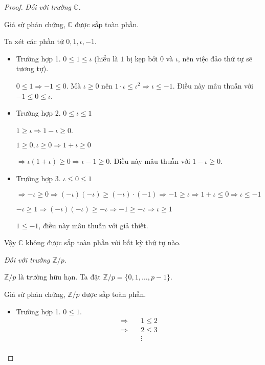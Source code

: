 \documentclass[class=linearalgebra,crop=false]{standalone}
\begin{document}
\begin{proof}\textit{Đối với trường $\mathbb{C}$.}
    \par Giả sử phản chứng, $\mathbb{C}$ được sắp toàn phần.
    \par Ta xét các phần tử $0, 1, \iota, -1$.
    \begin{itemize}
        \item Trường hợp 1. $0\le 1 \le \iota$ (hiểu là $1$ bị kẹp bởi $0$ và $\iota$, nên việc đảo thứ tự sẽ tương tự).
            \par $0\le 1\Rightarrow -1\le 0$. Mà $\iota\ge 0$ nên $1\cdot\iota \le \iota^{2} \Rightarrow \iota \le -1$. Điều này mâu thuẫn với $-1 \le 0 \le \iota$.
        \item Trường hợp 2. $0\le\iota\le 1$
            \par $1\ge\iota\Rightarrow 1 - \iota\ge 0$.
            \par $1\ge 0, \iota\ge 0\Rightarrow 1 + \iota \ge 0$
            \par $\Rightarrow \iota(1+\iota)\ge 0\Rightarrow \iota - 1\ge 0$. Điều này mâu thuẫn với $1 - \iota \ge 0$.
        \item Trường hợp 3. $\iota \le 0 \le 1$
            \par $\Rightarrow-\iota \ge 0\Rightarrow (-\iota)(-\iota)\ge (-\iota)\cdot (-1) \Rightarrow -1\ge\iota \Rightarrow 1 + \iota \le 0\Rightarrow\iota\le -1$
            \par $-\iota \ge 1\Rightarrow (-\iota)(-\iota) \ge -\iota \Rightarrow -1 \ge -\iota \Rightarrow \iota\ge 1$
            \par $1\le -1$, điều này mâu thuẫn với giả thiết.
    \end{itemize}
    \par Vậy $\mathbb{C}$ không được sắp toàn phần với bất kỳ thứ tự nào.
    \bigskip
    \par\textit{Đối với trường $\mathbb{Z}/p$.}
    \par $\mathbb{Z}/p$ là trường hữu hạn. Ta đặt $\mathbb{Z}/p = \{ 0, 1, \ldots, p - 1 \}$.
    \par Giả sử phản chứng, $\mathbb{Z}/p$ được sắp toàn phần.
    \begin{itemize}
        \item Trường hợp 1. $0\le 1$.
        \begin{align*}
            \Rightarrow\quad& 1\le 2 \\
            \Rightarrow\quad& 2\le 3 \\
                            & \vdots \\

\end{align*}
\end{itemize}
\end{proof}
\end{document}
